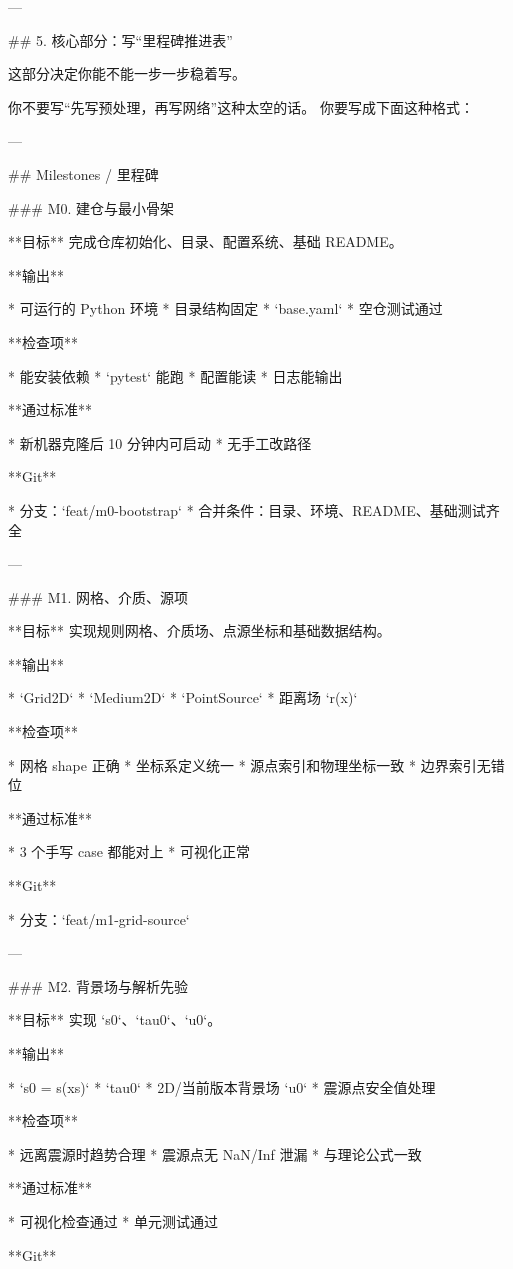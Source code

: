 ---

## 5. 核心部分：写“里程碑推进表”

这部分决定你能不能一步一步稳着写。

你不要写“先写预处理，再写网络”这种太空的话。
你要写成下面这种格式：

---

## Milestones / 里程碑

### M0. 建仓与最小骨架

**目标**
完成仓库初始化、目录、配置系统、基础 README。

**输出**

* 可运行的 Python 环境
* 目录结构固定
* `base.yaml`
* 空仓测试通过

**检查项**

* 能安装依赖
* `pytest` 能跑
* 配置能读
* 日志能输出

**通过标准**

* 新机器克隆后 10 分钟内可启动
* 无手工改路径

**Git**

* 分支：`feat/m0-bootstrap`
* 合并条件：目录、环境、README、基础测试齐全

---

### M1. 网格、介质、源项

**目标**
实现规则网格、介质场、点源坐标和基础数据结构。

**输出**

* `Grid2D`
* `Medium2D`
* `PointSource`
* 距离场 `r(x)`

**检查项**

* 网格 shape 正确
* 坐标系定义统一
* 源点索引和物理坐标一致
* 边界索引无错位

**通过标准**

* 3 个手写 case 都能对上
* 可视化正常

**Git**

* 分支：`feat/m1-grid-source`

---

### M2. 背景场与解析先验

**目标**
实现 `s0`、`tau0`、`u0`。

**输出**

* `s0 = s(xs)`
* `tau0`
* 2D/当前版本背景场 `u0`
* 震源点安全值处理

**检查项**

* 远离震源时趋势合理
* 震源点无 NaN/Inf 泄漏
* 与理论公式一致

**通过标准**

* 可视化检查通过
* 单元测试通过

**Git**

